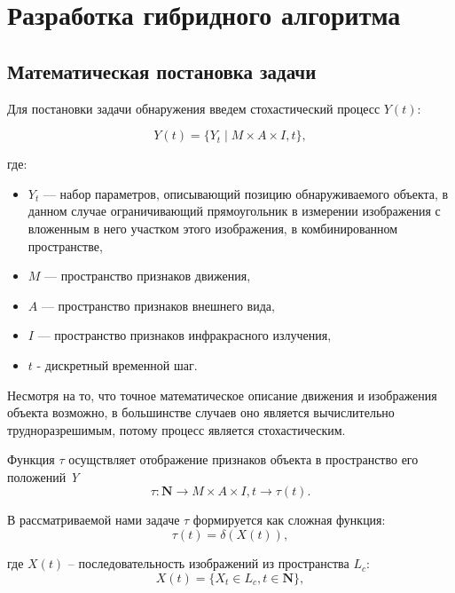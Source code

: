 \section{Разработка гибридного алгоритма}
\subsection{Математическая постановка задачи}
Для постановки задачи обнаружения введем стохастический процесс $Y(t)$:

\begin{equation}
Y(t) = \{Y_t \mid M \times A \times I, t \},
\end{equation}

где:
\begin{itemize}
    \item \( Y_t \) — набор параметров, описывающий позицию обнаруживаемого объекта, в данном случае ограничивающий прямоугольник в измерении изображения с вложенным в него участком этого изображения, в комбинированном пространстве,
    \item \( M \) — пространство признаков движения,
    \item \( A \) — пространство признаков внешнего вида,
    \item \( I \) — пространство признаков инфракрасного излучения,
    \item \( t \) - дискретный временной шаг.
\end{itemize}
 
Несмотря на то, что точное математическое описание движения и изображения объекта возможно, в большинстве случаев оно является вычислительно трудноразрешимым, потому процесс является стохастическим.

 Функция $\tau$ осущствляет отображение признаков объекта в пространство его положений \textit{Y}
\begin{equation}
\tau : \textbf{N} \rightarrow M \times A \times I, t \rightarrow \tau(t).
\end{equation}

В рассматриваемой нами задаче $\tau$ формируется как сложная функция:
\begin{equation}
\label{tau_t}
\tau(t) = \delta(X(t)),
\end{equation}

где $X(t)$ – последовательность изображений из пространства $L_c$:
\begin{equation}
X(t) = \{X_t \in L_c, t \in \textbf{N}\},
\end{equation}


